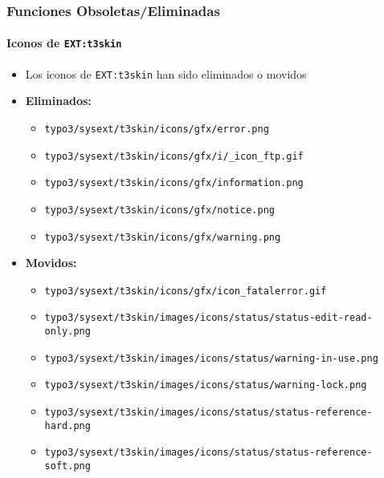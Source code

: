
\begin{frame}[fragile]
	\frametitle{Funciones Obsoletas/Eliminadas}
	\framesubtitle{Iconos de \texttt{EXT:t3skin}}

	\begin{itemize}

		\item Los iconos de \texttt{EXT:t3skin} han sido eliminados o movidos
		\item \textbf{Eliminados:}

			\begin{itemize}
				\item \smaller\texttt{typo3/sysext/t3skin/icons/gfx/error.png}
				\item \texttt{typo3/sysext/t3skin/icons/gfx/i/\_icon\_ftp.gif}
				\item \texttt{typo3/sysext/t3skin/icons/gfx/information.png}
				\item \texttt{typo3/sysext/t3skin/icons/gfx/notice.png}
				\item \texttt{typo3/sysext/t3skin/icons/gfx/warning.png}
			\end{itemize}

		\item \textbf{Movidos:}

			\begin{itemize}
				\item \smaller\texttt{typo3/sysext/t3skin/icons/gfx/icon\_fatalerror.gif}
				\item \texttt{typo3/sysext/t3skin/images/icons/status/status-edit-read-only.png}
				\item \texttt{typo3/sysext/t3skin/images/icons/status/warning-in-use.png}
				\item \texttt{typo3/sysext/t3skin/images/icons/status/warning-lock.png}
				\item \texttt{typo3/sysext/t3skin/images/icons/status/status-reference-hard.png}
				\item \texttt{typo3/sysext/t3skin/images/icons/status/status-reference-soft.png}
			\end{itemize}

	\end{itemize}

\end{frame}

